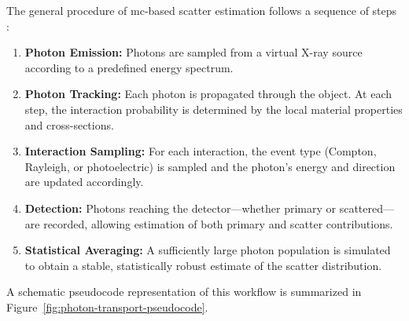 The general procedure of \ac{mc}-based scatter estimation follows a sequence of steps \cite{mcffd2011}:

\begin{enumerate}
    \item \textbf{Photon Emission:} Photons are sampled from a virtual X-ray
    source according to a predefined energy spectrum.
        
    \item \textbf{Photon Tracking:} Each photon is propagated through the
    object. At each step, the interaction probability is determined by the local
    material properties and cross-sections.
        
    \item \textbf{Interaction Sampling:} For each interaction, the event type
    (Compton, Rayleigh, or photoelectric) is sampled and the photon's energy
    and direction are updated accordingly.
        
    \item \textbf{Detection:} Photons reaching the detector—whether primary or
    scattered—are recorded, allowing estimation of both primary and scatter
    contributions.
        
    \item \textbf{Statistical Averaging:} A sufficiently large photon population
    is simulated to obtain a stable, statistically robust estimate of the
    scatter distribution.
\end{enumerate}

A schematic pseudocode representation of this workflow is summarized in
Figure~\ref{fig:photon-transport-pseudocode}.

